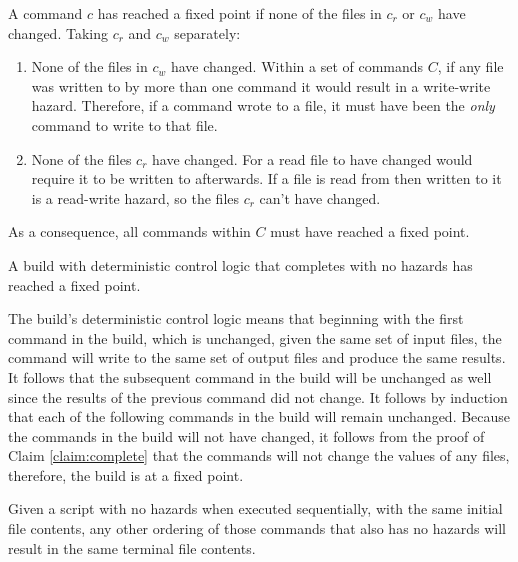 \proof A command $c$ has reached a fixed point if none of the files in $c_r$ or $c_w$ have changed. Taking $c_r$ and $c_w$ separately:

\begin{enumerate}
\item None of the files in $c_w$ have changed. Within a set of commands $C$, if any file was written to by more than one command it would result in a write-write hazard. Therefore, if a command wrote to a file, it must have been the \emph{only} command to write to that file.
\item None of the files $c_r$ have changed. For a read file to have changed would require it to be written to afterwards. If a file is read from then written to it is a read-write hazard, so the files $c_r$ can't have changed.
\end{enumerate}

As a consequence, all commands within $C$ must have reached a fixed point.


\begin{claim} A build with deterministic control logic that completes with no hazards has reached a fixed point.  %
\label{claim:no_rebuild}
\end{claim}


\proof The build's deterministic control logic means that beginning with the first command in the build, which is unchanged, given the same set of input files, the command will write to the same set of output files and produce the same results.  It follows that the subsequent command in the build will be unchanged as well since the results of the previous command did not change.  It follows by induction that each of the following commands in the build will remain unchanged.
Because the commands in the build will not have changed, it follows from the proof of Claim \ref{claim:complete} that the commands will not change the values of any files, therefore, the build is at a fixed point.

\begin{claim}
\label{claim:reorder}

Given a script with no hazards when executed sequentially, with the same initial file contents, any other ordering of those commands that also has no hazards will result in the same terminal file contents.
\end{claim}


